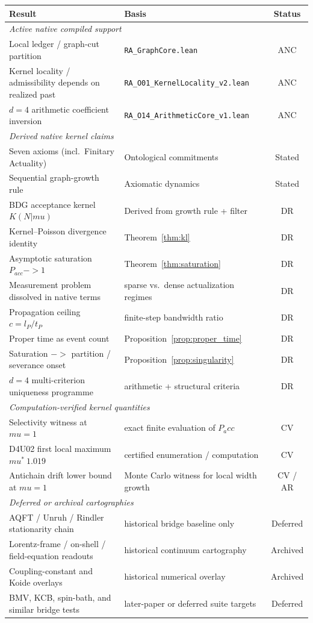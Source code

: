 \documentclass[11pt]{article}
\def\ell{l}%
\def\mu{mu}%
\def\mathrm#1{#1}%
\def\mathbf#1{#1}%
\def\approx{~}%
\def\to{->}%
\def\Pacc{P_acc}%
\newcommand{\Pacc}{P_{\mathrm{acc}}}
\begin{document}
\begin{center}
\begin{tabular}{llc}
\toprule
Result & Basis & Status \\
\midrule
\multicolumn{3}{l}{\textit{Active native compiled support}} \\
Local ledger / graph-cut partition & \texttt{RA\_GraphCore.lean} & ANC \\
Kernel locality / admissibility depends on realized past & \texttt{RA\_O01\_KernelLocality\_v2.lean} & ANC \\
$d=4$ arithmetic coefficient inversion & \texttt{RA\_O14\_ArithmeticCore\_v1.lean} & ANC \\
\midrule
\multicolumn{3}{l}{\textit{Derived native kernel claims}} \\
Seven axioms (incl.\ Finitary Actuality) & Ontological commitments & Stated \\
Sequential graph-growth rule & Axiomatic dynamics & Stated \\
BDG acceptance kernel $K(\mathbf{N}|\mu)$ & Derived from growth rule + filter & DR \\
Kernel--Poisson divergence identity & Theorem~\ref{thm:kl} & DR \\
Asymptotic saturation $P_{\mathrm{acc}}\to 1$ & Theorem~\ref{thm:saturation} & DR \\
Measurement problem dissolved in native terms & sparse vs.\ dense actualization regimes & DR \\
Propagation ceiling $c=\ell_P/t_P$ & finite-step bandwidth ratio & DR \\
Proper time as event count & Proposition~\ref{prop:proper_time} & DR \\
Saturation $\to$ partition / severance onset & Proposition~\ref{prop:singularity} & DR \\
$d=4$ multi-criterion uniqueness programme & arithmetic + structural criteria & DR \\
\midrule
\multicolumn{3}{l}{\textit{Computation-verified kernel quantities}} \\
Selectivity witness at $\mu=1$ & exact finite evaluation of $\Pacc$ & CV \\
D4U02 first local maximum $\mu^*\approx 1.019$ & certified enumeration / computation & CV \\
Antichain drift lower bound at $\mu=1$ & Monte Carlo witness for local width growth & CV / AR \\
\midrule
\multicolumn{3}{l}{\textit{Deferred or archival cartographies}} \\
AQFT / Unruh / Rindler stationarity chain & historical bridge baseline only & Deferred \\
Lorentz-frame / on-shell / field-equation readouts & historical continuum cartography & Archived \\
Coupling-constant and Koide overlays & historical numerical overlay & Archived \\
BMV, KCB, spin-bath, and similar bridge tests & later-paper or deferred suite targets & Deferred \\
\bottomrule
\end{tabular}
\end{center}
\end{document}

